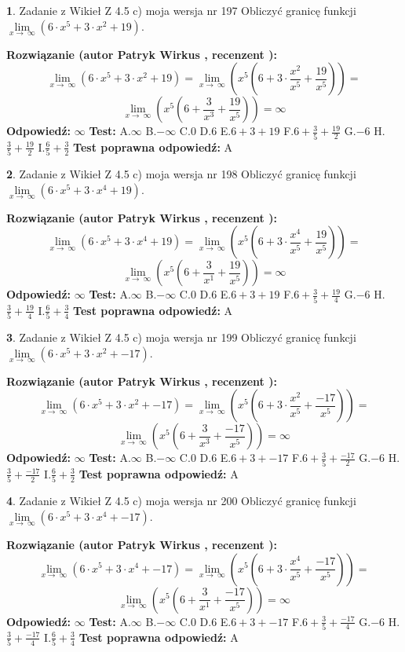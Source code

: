 \documentclass[12pt, a4paper]{article}
\theoremstyle{definition} %
\newtheorem{zad}{}
\newcommand{\zadStart}[1]{\begin{zad}#1\newline}
\newcommand{\zadStop}{\end{zad}}
\newcommand{\rozwStart}[2]{\noindent \textbf{Rozwiązanie (autor #1 , recenzent #2): }\newline}
\newcommand{\rozwStop}{\newline}
\newcommand{\odpStart}{\noindent \textbf{Odpowiedź:}\newline}
\newcommand{\odpStop}{\newline}
\newcommand{\testStart}{\noindent \textbf{Test:}\newline}
\newcommand{\testStop}{\newline}
\newcommand{\kluczStart}{\noindent \textbf{Test poprawna odpowiedź:}\newline}
\newcommand{\kluczStop}{\newline}
\begin{document}
\zadStart{Zadanie z Wikieł Z 4.5 c) moja wersja nr 197}
Obliczyć granicę funkcji  $\lim\limits_{x\to\ \infty}(6 \cdot x^{5}+3 \cdot x^{2}+19)$.
\zadStop
\rozwStart{Patryk Wirkus}{}
$$\lim\limits_{x\to\ \infty}(6 \cdot x^{5}+3 \cdot x^{2}+19) = \lim\limits_{x\to\ \infty}(x^{5}(6 +3 \cdot \frac{x^{2}}{x^{5}}+\frac{19}{x^{5}})) =$$ $$\lim\limits_{x\to\ \infty}(x^{5}(6 +\frac{3}{x^{3}}+\frac{19}{x^{5}})) =\infty$$
\rozwStop
\odpStart
$\infty$
\odpStop
\testStart
A.$\infty$ B.$-\infty$ C.$0$ D.$6$ E.$6 + 3 + 19$
F.$6+\frac{3}{5}+\frac{19}{2}$ G.$-6$
H.$\frac{3}{5}+\frac{19}{2}$
I.$\frac{6}{5}+\frac{3}{2}$
\testStop
\kluczStart
A
\kluczStop



\zadStart{Zadanie z Wikieł Z 4.5 c) moja wersja nr 198}
Obliczyć granicę funkcji  $\lim\limits_{x\to\ \infty}(6 \cdot x^{5}+3 \cdot x^{4}+19)$.
\zadStop
\rozwStart{Patryk Wirkus}{}
$$\lim\limits_{x\to\ \infty}(6 \cdot x^{5}+3 \cdot x^{4}+19) = \lim\limits_{x\to\ \infty}(x^{5}(6 +3 \cdot \frac{x^{4}}{x^{5}}+\frac{19}{x^{5}})) =$$ $$\lim\limits_{x\to\ \infty}(x^{5}(6 +\frac{3}{x^{1}}+\frac{19}{x^{5}})) =\infty$$
\rozwStop
\odpStart
$\infty$
\odpStop
\testStart
A.$\infty$ B.$-\infty$ C.$0$ D.$6$ E.$6 + 3 + 19$
F.$6+\frac{3}{5}+\frac{19}{4}$ G.$-6$
H.$\frac{3}{5}+\frac{19}{4}$
I.$\frac{6}{5}+\frac{3}{4}$
\testStop
\kluczStart
A
\kluczStop



\zadStart{Zadanie z Wikieł Z 4.5 c) moja wersja nr 199}
Obliczyć granicę funkcji  $\lim\limits_{x\to\ \infty}(6 \cdot x^{5}+3 \cdot x^{2}+-17)$.
\zadStop
\rozwStart{Patryk Wirkus}{}
$$\lim\limits_{x\to\ \infty}(6 \cdot x^{5}+3 \cdot x^{2}+-17) = \lim\limits_{x\to\ \infty}(x^{5}(6 +3 \cdot \frac{x^{2}}{x^{5}}+\frac{-17}{x^{5}})) =$$ $$\lim\limits_{x\to\ \infty}(x^{5}(6 +\frac{3}{x^{3}}+\frac{-17}{x^{5}})) =\infty$$
\rozwStop
\odpStart
$\infty$
\odpStop
\testStart
A.$\infty$ B.$-\infty$ C.$0$ D.$6$ E.$6 + 3 + -17$
F.$6+\frac{3}{5}+\frac{-17}{2}$ G.$-6$
H.$\frac{3}{5}+\frac{-17}{2}$
I.$\frac{6}{5}+\frac{3}{2}$
\testStop
\kluczStart
A
\kluczStop



\zadStart{Zadanie z Wikieł Z 4.5 c) moja wersja nr 200}
Obliczyć granicę funkcji  $\lim\limits_{x\to\ \infty}(6 \cdot x^{5}+3 \cdot x^{4}+-17)$.
\zadStop
\rozwStart{Patryk Wirkus}{}
$$\lim\limits_{x\to\ \infty}(6 \cdot x^{5}+3 \cdot x^{4}+-17) = \lim\limits_{x\to\ \infty}(x^{5}(6 +3 \cdot \frac{x^{4}}{x^{5}}+\frac{-17}{x^{5}})) =$$ $$\lim\limits_{x\to\ \infty}(x^{5}(6 +\frac{3}{x^{1}}+\frac{-17}{x^{5}})) =\infty$$
\rozwStop
\odpStart
$\infty$
\odpStop
\testStart
A.$\infty$ B.$-\infty$ C.$0$ D.$6$ E.$6 + 3 + -17$
F.$6+\frac{3}{5}+\frac{-17}{4}$ G.$-6$
H.$\frac{3}{5}+\frac{-17}{4}$
I.$\frac{6}{5}+\frac{3}{4}$
\testStop
\kluczStart
A
\kluczStop
\end{document}
